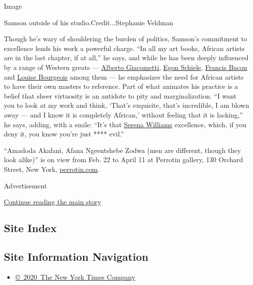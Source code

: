 Image

Samson outside of his studio.Credit...Stephanie Veldman

Though he's wary of shouldering the burden of politics, Samson's
commitment to excellence lends his work a powerful charge. ``In all my
art books, African artists are in the last chapter, if at all,'' he
says, and while he has been deeply influenced by a range of Western
greats ---
\href{https://www.nytimes3xbfgragh.onion/topic/person/alberto-giacometti}{Alberto
Giacometti},
\href{https://www.nytimes3xbfgragh.onion/topic/person/egon-schiele}{Egon
Schiele},
\href{https://www.nytimes3xbfgragh.onion/topic/person/francis-bacon}{Francis
Bacon} and
\href{https://www.nytimes3xbfgragh.onion/topic/person/louise-bourgeois}{Louise
Bourgeois} among them --- he emphasizes the need for African artists to
have their own masters to reference. Part of what animates his practice
is a belief that sheer virtuosity is an antidote to pity and
marginalization. ``I want you to look at my work and think, `That's
exquisite, that's incredible, I am blown away --- and I know it is
completely African,' without feeling that it is lacking,'' he says,
adding, with a smile: ``It's that
\href{https://www.nytimes3xbfgragh.onion/topic/person/serena-williams}{Serena
Williams} excellence, which, if you deny it, you know you're just ****
evil.''

``Amadoda Akafani, Afana Ngeentshebe Zodwa (men are different, though
they look alike)'' is on view from Feb. 22 to April 11 at Perrotin
gallery, 130 Orchard Street, New York,
\href{https://www.perrotin.com/artists/cinga_samson/488\#news}{perrotin.com}.

Advertisement

\protect\hyperlink{after-bottom}{Continue reading the main story}

\hypertarget{site-index}{%
\subsection{Site Index}\label{site-index}}

\hypertarget{site-information-navigation}{%
\subsection{Site Information
Navigation}\label{site-information-navigation}}

\begin{itemize}
\tightlist
\item
  \href{https://help.nytimes3xbfgragh.onion/hc/en-us/articles/115014792127-Copyright-notice}{©~2020~The
  New York Times Company}
\end{itemize}

